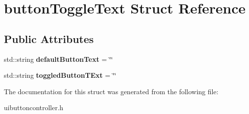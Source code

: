 \hypertarget{structbutton_toggle_text}{}\section{button\+Toggle\+Text Struct Reference}
\label{structbutton_toggle_text}
\subsection*{Public Attributes}
\begin{DoxyCompactItemize}
\item 
\mbox{\label{structbutton_toggle_text_a635dd905457ad48d3a8a2bfed72371a5}} 
std\+::string {\bfseries default\+Button\+Text} = \char`\"{}\char`\"{}
\item 
\mbox{\label{structbutton_toggle_text_a59465c25a5434b5c5ad4170062afc0a8}} 
std\+::string {\bfseries toggled\+Button\+T\+Ext} = \char`\"{}\char`\"{}
\end{DoxyCompactItemize}


The documentation for this struct was generated from the following file\+:\begin{DoxyCompactItemize}
\item 
uibuttoncontroller.\+h\end{DoxyCompactItemize}
